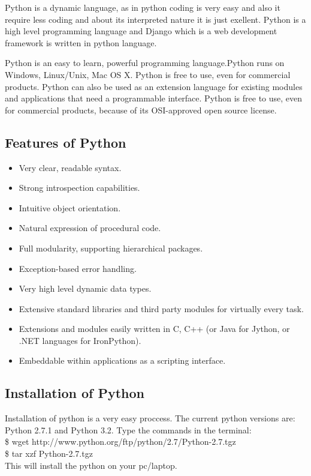 \begin{figure}[h]
\end{figure}
\noindent Python is a dynamic language, as in python coding is very easy and 
also it require less coding and about its interpreted nature it is 
just exellent. Python is a high level programming language and Django 
which is a web development framework is written in python language.

Python is an easy to learn, powerful programming language.Python runs 
on Windows, Linux/Unix, Mac OS X. Python is free to use, even for 
commercial products. Python can also be used as an extension language 
for existing modules and applications that need a programmable interface.  
Python is free to use, even for commercial products, because of its 
OSI-approved open source license.
\subsection{Features of Python}
\begin{itemize}
\item Very clear, readable syntax.
\item Strong introspection capabilities.
\item Intuitive object orientation.
\item Natural expression of procedural code.
\item Full modularity, supporting hierarchical packages.
\item Exception-based error handling.
\item Very high level dynamic data types.
\item Extensive standard libraries and third party modules for virtually every task.
\item Extensions and modules easily written in C, C++ (or Java for Jython, or .NET languages for IronPython).
\item Embeddable within applications as a scripting interface.
\end{itemize}
\subsection{Installation of Python}
Installation of python is a very easy proccess.
The current python versions are: Python 2.7.1 and Python 3.2.
Type the commands in the terminal:\\

 \$ wget http://www.python.org/ftp/python/2.7/Python-2.7.tgz\\

 
 \$ tar xzf Python-2.7.tgz\\


This will install the python on your pc/laptop.

